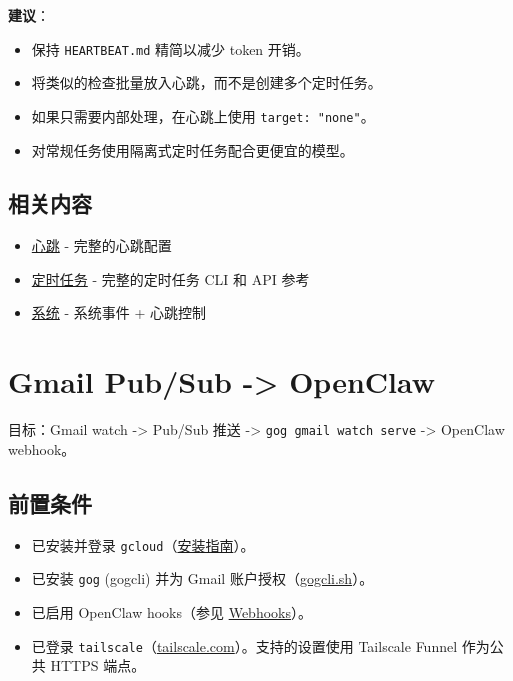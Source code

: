 \textbf{建议}：

\begin{itemize}
  \item 保持 \texttt{HEARTBEAT.md} 精简以减少 token 开销。
  \item 将类似的检查批量放入心跳，而不是创建多个定时任务。
  \item 如果只需要内部处理，在心跳上使用 \texttt{target: "none"}。
  \item 对常规任务使用隔离式定时任务配合更便宜的模型。
\end{itemize}


\subsection{相关内容}


\begin{itemize}
  \item \href{/gateway/heartbeat}{心跳} - 完整的心跳配置
  \item \href{/automation/cron-jobs}{定时任务} - 完整的定时任务 CLI 和 API 参考
  \item \href{/cli/system}{系统} - 系统事件 + 心跳控制
\end{itemize}



\clearpage

\section{Gmail Pub/Sub -> OpenClaw}


目标：Gmail watch -> Pub/Sub 推送 -> \texttt{gog gmail watch serve} -> OpenClaw webhook。

\subsection{前置条件}


\begin{itemize}
  \item 已安装并登录 \texttt{gcloud}（\href{https://docs.cloud.google.com/sdk/docs/install-sdk}{安装指南}）。
  \item 已安装 \texttt{gog} (gogcli) 并为 Gmail 账户授权（\href{https://gogcli.sh/}{gogcli.sh}）。
  \item 已启用 OpenClaw hooks（参见 \href{/automation/webhook}{Webhooks}）。
  \item 已登录 \texttt{tailscale}（\href{https://tailscale.com/}{tailscale.com}）。支持的设置使用 Tailscale Funnel 作为公共 HTTPS 端点。
\end{itemize}

